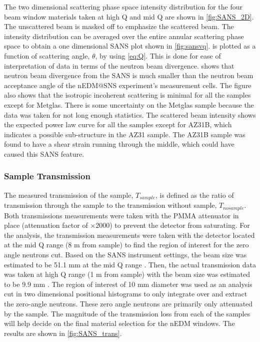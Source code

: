 The two dimensional scattering phase space intensity distribution for the four beam window materials taken at high Q and mid Q are shown in \cref{fig:SANS_2D}. The unscattered beam is masked off to emphasize the scattered beam. The intensity distribution can be averaged over the entire annular scattering phase space to obtain a one dimensional SANS plot shown in \cref{fig:sansvq}.  is plotted as a function of scattering angle, $\theta$, by using \cref{eq:Q}. This is done for ease of interpretation of data in terms of the neutron beam divergence.  shows that neutron beam divergence from the SANS is much smaller than the neutron beam acceptance angle of the nEDM@SNS experiment's measurement cells. The figure also shows that the isotropic incoherent scattering is minimal for all the samples except for Metglas. There is some uncertainty on the Metglas sample because the data was taken for not long enough statistics. The scattered beam intensity shows the expected power law curve for all the samples except for AZ31B, which indicates a possible sub-structure in the AZ31 sample. The AZ31B sample was found to have a shear strain running through the middle, which could have caused this SANS feature. 

\subsubsection{Sample Transmission}

The measured transmission of the sample, $T_{sample}$, is defined as the ratio of transmission through the sample to the transmission without sample, $T_{nosample}$. Both transmissions measurements were taken with the PMMA attenuator in place (attenuation factor of $\times2000$) to prevent the detector from saturating. For the analysis, the transmission measurements were taken with the detector located at the mid Q range (8 m from sample) to find the region of interest for the zero angle neutrons cut. Based on the SANS instrument settings, the beam size was estimated to be 51.1 mm at the mid Q range \cite{Debeer-Schmitt2023}. Then, the actual transmission data was taken at high Q range (1 m from sample) with the beam size was estimated to be 9.9 mm \cite{Debeer-Schmitt2023}. The region of interest of 10 mm diameter was used as an analysis cut in two dimensional positional histograms to only integrate over and extract the zero-angle neutrons. These zero angle neutrons are primarily only attenuated by the sample. The magnitude of the transmission loss from each of the samples will help decide on the final material selection for the nEDM windows. The results are shown in \cref{fig:SANS_trans}. 

